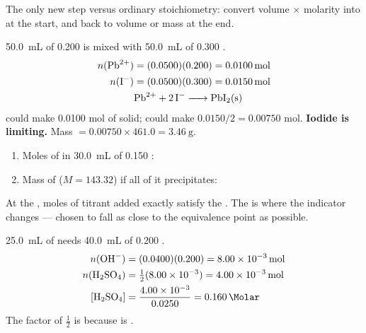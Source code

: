 \documentclass{apchem-notes}
\begin{document}


The only new step versus ordinary stoichiometry: convert
volume $\times$ molarity into  at the start, and
back to volume or mass at the end.

\begin{workedexample}
\SI{50.0}{\milli\liter} of \SI{0.200}{\Molar}  is mixed with
\SI{50.0}{\milli\liter} of \SI{0.300}{\Molar} .
\begin{align*}
  n(\ce{Pb^2+}) &= (0.0500)(0.200) = \SI{0.0100}{\mole}\\
  n(\ce{I-}) &= (0.0500)(0.300) = \SI{0.0150}{\mole}\\
  &\ce{Pb^2+ + 2 I^- -> PbI2(s)}
\end{align*}
 could make 0.0100 mol of solid;  could make
$0.0150/2 = 0.00750$ mol. \textbf{Iodide is limiting.}
Mass $= 0.00750 \times 461.0 = \SI{3.46}{\gram}$.
\end{workedexample}


\begin{enumerate}[leftmargin=*,itemsep=0.35em]
  \item Moles of  in \SI{30.0}{\milli\liter} of
        \SI{0.150}{\Molar} :
  \item Mass of  ($M = 143.32$) if all of it precipitates:
\end{enumerate}



At the , moles of titrant added exactly satisfy the
. The  is where the
indicator changes --- chosen to fall as close to the equivalence point as
possible.

\begin{workedexample}
\SI{25.0}{\milli\liter} of  needs \SI{40.0}{\milli\liter} of
\SI{0.200}{\Molar} .
\begin{align*}
  n(\ce{OH-}) &= (0.0400)(0.200) = \SI{8.00e-3}{\mole}\\
  n(\ce{H2SO4}) &= \tfrac12(8.00\times10^{-3}) = \SI{4.00e-3}{\mole}\\
  [\ce{H2SO4}] &= \frac{4.00\times10^{-3}}{0.0250} = \SI{0.160}{\Molar}
\end{align*}
The factor of $\tfrac12$ is because  is
.
\end{workedexample}
\end{document}
